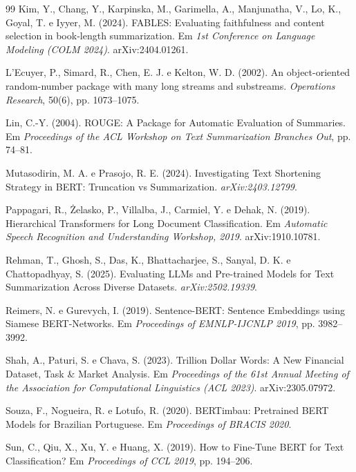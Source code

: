 \documentclass[12pt]{article}
\begin{document}
\begin{thebibliography}{99}
Kim, Y., Chang, Y., Karpinska, M., Garimella, A., Manjunatha, V., Lo, K.,
Goyal, T. e Iyyer, M. (2024). FABLES: Evaluating faithfulness and content
selection in book-length summarization. Em \textit{1st Conference on Language
Modeling (COLM 2024)}. arXiv:2404.01261.

L'Ecuyer, P., Simard, R., Chen, E. J. e Kelton, W. D. (2002). An
object-oriented random-number package with many long streams and substreams.
\textit{Operations Research}, 50(6), pp. 1073--1075.

Lin, C.-Y. (2004). ROUGE: A Package for Automatic Evaluation of Summaries. Em
\textit{Proceedings of the ACL Workshop on Text Summarization Branches Out},
pp. 74--81.

Mutasodirin, M. A. e Prasojo, R. E. (2024). Investigating Text Shortening
Strategy in BERT: Truncation vs Summarization. \textit{arXiv:2403.12799}.

Pappagari, R., \.{Z}elasko, P., Villalba, J., Carmiel, Y. e Dehak, N. (2019).
Hierarchical Transformers for Long Document Classification. Em
\textit{Automatic Speech Recognition and Understanding Workshop, 2019}.
arXiv:1910.10781.

Rehman, T., Ghosh, S., Das, K., Bhattacharjee, S., Sanyal, D. K. e
Chattopadhyay, S. (2025). Evaluating LLMs and Pre-trained Models for Text
Summarization Across Diverse Datasets. \textit{arXiv:2502.19339}.

Reimers, N. e Gurevych, I. (2019). Sentence-BERT: Sentence Embeddings using
Siamese BERT-Networks. Em \textit{Proceedings of EMNLP-IJCNLP 2019},
pp. 3982--3992.

Shah, A., Paturi, S. e Chava, S. (2023). Trillion Dollar Words: A New Financial
Dataset, Task \& Market Analysis. Em \textit{Proceedings of the 61st Annual
Meeting of the Association for Computational Linguistics (ACL 2023)}.
arXiv:2305.07972.

Souza, F., Nogueira, R. e Lotufo, R. (2020). BERTimbau: Pretrained BERT Models
for Brazilian Portuguese. Em \textit{Proceedings of BRACIS 2020}.

Sun, C., Qiu, X., Xu, Y. e Huang, X. (2019). How to Fine-Tune BERT for Text
Classification? Em \textit{Proceedings of CCL 2019}, pp. 194--206.

\end{thebibliography}
\end{document}
